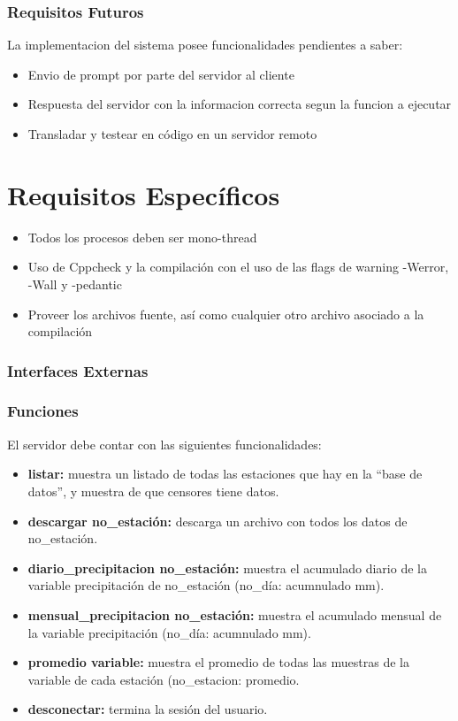 \documentclass[10pt, a4paper,notitlepage]{article}
\begin{document}
{\subsubsection{Requisitos Futuros}
La implementacion del sistema posee funcionalidades pendientes a saber:
\begin{itemize}
	\item Envio de prompt por parte del servidor al cliente 
	\item Respuesta del servidor con la informacion correcta segun la funcion a ejecutar
	\item Transladar y testear en código en un servidor remoto 
	
\end{itemize}
\section{Requisitos Específicos}
\begin{itemize}
	\item Todos los procesos deben ser mono-thread
	\item Uso de Cppcheck y la compilación con el uso de las flags de warning -Werror, -Wall y -pedantic
	\item Proveer los archivos fuente, así como cualquier otro archivo asociado
	a la compilación
	
\end{itemize}

\subsubsection{Interfaces Externas}
\subsubsection{Funciones}
El servidor debe contar con las siguientes funcionalidades:
\begin{itemize}
	\item \textbf{listar:} muestra un listado de todas las estaciones que hay en la “base de datos”,
	y muestra de que censores tiene datos.
	\item \textbf{descargar no\_estación:} descarga un archivo con todos los datos de
	no\_estación.
	\item \textbf{diario\_precipitacion no\_estación:} muestra el acumulado diario de la variable
	precipitación de no\_estación (no\_día: acumnulado mm).
	\item\textbf{ mensual\_precipitacion no\_estación:} muestra el acumulado mensual de la
	variable precipitación (no\_día: acumnulado mm).
	\item \textbf{promedio variable:} muestra el promedio de todas las muestras de la variable
	de cada estación (no\_estacion: promedio.
	\item \textbf{desconectar:} termina la sesión del usuario.
\end{itemize}

}
\end{document}
